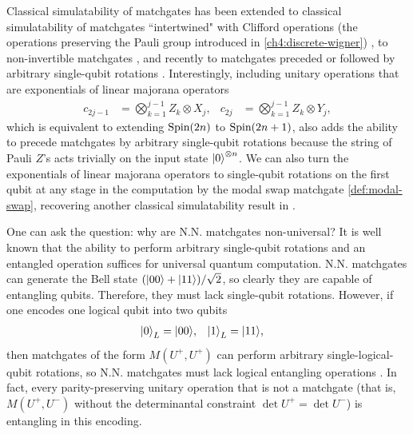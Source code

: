 Classical simulatability of matchgates has been extended to classical simulatability of matchgates ``intertwined" with Clifford operations (the operations preserving the Pauli group introduced in \autoref{ch4:discrete-wigner}) \cite{jozsa_matchgates_2008}, to non-invertible matchgates \cite{knill_fermionic_2001,jozsa_jordan-wigner_2015}, and recently to matchgates preceded or followed by arbitrary single-qubit rotations \cite{brod_efficient_2016}. Interestingly, including unitary operations that are exponentials of linear majorana operators
\begin{align}
c_{2j-1} &= \bigotimes_{k=1}^{j-1} Z_k \otimes X_j, &
c_{2j} &= \bigotimes_{k=1}^{j-1} Z_k \otimes Y_j,
\end{align}
which is equivalent to extending $\text{Spin}(2n)$ to $\text{Spin}(2n+1)$, also adds the ability to precede matchgates by arbitrary single-qubit rotations because the string of Pauli $Z$'s acts trivially on the input state ${\left\vert{0}\right\rangle}^{\otimes n}$. We can also turn the exponentials of linear majorana operators to single-qubit rotations on the first qubit at any stage in the computation by the modal swap matchgate \eqref{def:modal-swap}, recovering another classical simulatability result in \cite{jozsa_jordan-wigner_2015}.

One can ask the question: why are N.N. matchgates non-universal? It is well known that the ability to perform arbitrary single-qubit rotations and an entangled operation suffices for universal quantum computation. N.N. matchgates can generate the Bell state $({\left\vert{00}\right\rangle} + {\left\vert{11}\right\rangle})/\sqrt{2}$, so clearly they are capable of entangling qubits. Therefore, they must lack single-qubit rotations. However, if one encodes one logical qubit into two qubits
\begin{align}
	{\left\vert{0}\right\rangle}_L &= {\left\vert{00}\right\rangle}, & {\left\vert{1}\right\rangle}_L &= {\left\vert{11}\right\rangle},
\end{align}
then matchgates of the form $M(U^+,U^+)$ can perform arbitrary single-logical-qubit rotations, so N.N. matchgates must lack logical entangling operations \cite{brod_extending_2011}. In fact, every parity-preserving unitary operation that is not a matchgate (that is, $M(U^+,U^-)$ without the determinantal constraint $\det U^+ = \det U^-$) is entangling in this encoding.

